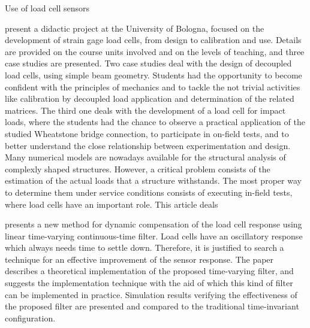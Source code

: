 \documentclass[11pt]{article}
\begin{document}
Use of load cell sensors

\citet{Olmi16} present a didactic project at the University of Bologna, focused on the development of strain gage load cells, from design to calibration and use. Details are provided on the course units involved and on the levels of teaching, and three case studies are presented. Two case studies deal with the design of decoupled load cells, using simple beam geometry. Students had the opportunity to become confident with the principles of mechanics and to tackle the not trivial activities like calibration by decoupled load application and determination of the related matrices. The third one deals with the development of a load cell for impact loads, where the students had the chance to observe a practical application of the studied Wheatstone bridge connection, to participate in on-field tests, and to better understand the close relationship between experimentation and design.
Many numerical models are nowadays available for the structural analysis of complexly shaped structures. However, a critical problem consists of the estimation of the actual loads that a structure withstands. The most proper way to determine them under service conditions consists of executing in-field tests, where load cells have an important role. This article deals

\citet{Piskorowski08} presents a new method for dynamic compensation of the load cell response using linear time-varying continuous-time filter. Load cells have an oscillatory response which always needs time to settle down. Therefore, it is justified to search a technique for an effective improvement of the sensor response. The paper describes a theoretical implementation of the proposed time-varying filter, and suggests the implementation technique with the aid of which this kind of filter can be implemented in practice. Simulation results verifying the effectiveness of the proposed filter are presented and compared to the traditional time-invariant configuration.
\end{document}
